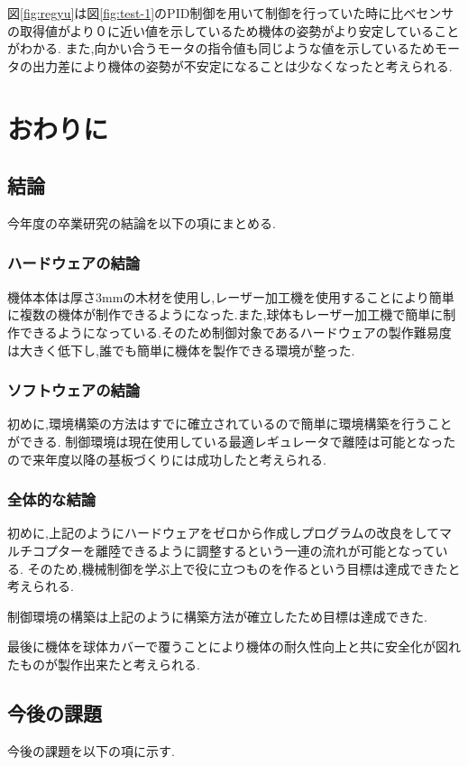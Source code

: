 \documentclass[12pt,oneside]{sotsuken_paper}
\begin{document}
図\ref{fig:regyu}は図\ref{fig:test-1}のPID制御を用いて制御を行っていた時に比べセンサの取得値がより０に近い値を示しているため機体の姿勢がより安定していることがわかる.
また,向かい合うモータの指令値も同じような値を示しているためモータの出力差により機体の姿勢が不安定になることは少なくなったと考えられる.

\chapter{おわりに}

\section{結論}
今年度の卒業研究の結論を以下の項にまとめる.

\subsection{ハードウェアの結論}
機体本体は厚さ3mmの木材を使用し,レーザー加工機を使用することにより簡単に複数の機体が制作できるようになった.また,球体もレーザー加工機で簡単に制作できるようになっている.そのため制御対象であるハードウェアの製作難易度は大きく低下し,誰でも簡単に機体を製作できる環境が整った.

\subsection{ソフトウェアの結論}
初めに,環境構築の方法はすでに確立されているので簡単に環境構築を行うことができる.
制御環境は現在使用している最適レギュレータで離陸は可能となったので来年度以降の基板づくりには成功したと考えられる.

\subsection{全体的な結論}
初めに,上記のようにハードウェアをゼロから作成しプログラムの改良をしてマルチコプターを離陸できるように調整するという一連の流れが可能となっている.
そのため,機械制御を学ぶ上で役に立つものを作るという目標は達成できたと考えられる.


制御環境の構築は上記のように構築方法が確立したため目標は達成できた.


最後に機体を球体カバーで覆うことにより機体の耐久性向上と共に安全化が図れたものが製作出来たと考えられる.

\section{今後の課題}
今後の課題を以下の項に示す.
\end{document}
